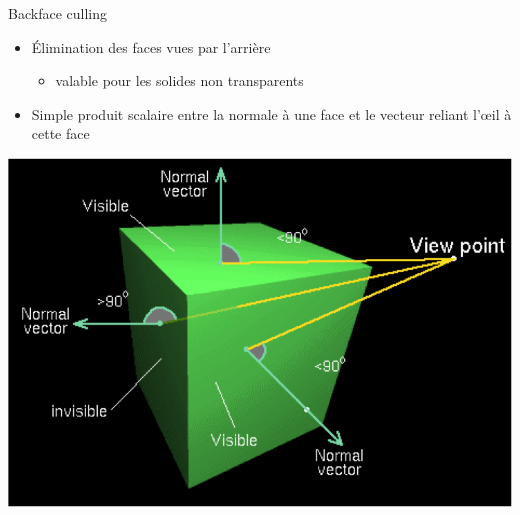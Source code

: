 \begin{frame}{Backface culling}
\begin{itemize}
\item Élimination des faces vues par l'arrière
\begin{itemize}
\item valable pour les solides non transparents
\end{itemize}
\item Simple produit scalaire entre la normale à une face et le vecteur reliant l'\oe il à cette face
\end{itemize}
\begin{center}
\includegraphics[height=.5\textheight]{figs/bfc.png}
\end{center}
\end{frame}
